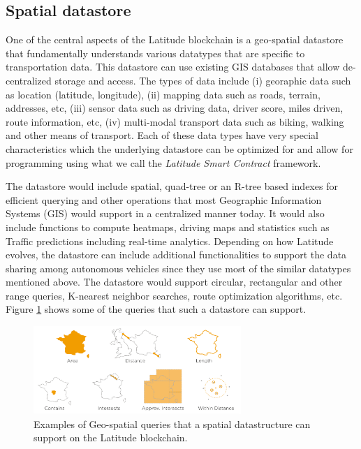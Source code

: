 \subsection{Spatial datastore}
One of the central aspects of the Latitude blockchain is a geo-spatial datastore that fundamentally understands various
datatypes that are specific to transportation data. This datastore can use existing GIS databases that allow
de-centralized storage and access. The types of data include (i) georaphic data such as location (latitude, longitude),
(ii) mapping data such as roads, terrain, addresses, etc, (iii) sensor data such as driving data, driver score, miles
driven, route information, etc, (iv) multi-modal transport data such as biking, walking and other means of transport.
Each of these data types have very special characteristics which the underlying datastore can be optimized for and allow
for programming using what we call the {\em Latitude Smart Contract} framework. 

The datastore would include spatial, quad-tree or an R-tree based indexes for efficient querying and other operations that
most Geographic Information Systems (GIS) would support in a centralized manner today. It would also include functions
to compute heatmaps, driving maps and statistics such as Traffic predictions including real-time analytics. Depending on
how Latitude evolves, the datastore can include additional functionalities to support the data sharing among autonomous
vehicles since they use most of the similar datatypes mentioned above. The datastore would support circular, rectangular
and other range queries, K-nearest neighbor searches, route optimization algorithms, etc. Figure
\ref{fig:geo_spatial_query} shows some of the queries that such a datastore can support.

\begin{figure}[t]
    \centering
    \includegraphics[width=0.70\textwidth]{geospatial_query.png}
  \caption{Examples of Geo-spatial queries that a spatial datastructure can support on the Latitude blockchain.}
    \label{fig:geo_spatial_query}
\end{figure}


